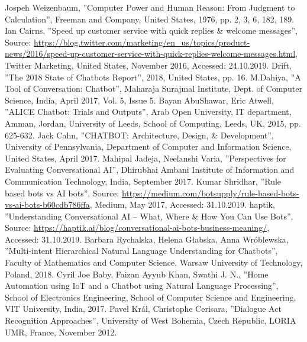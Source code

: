 \documentclass[10pt,final,journal,a4paper,oneside,twocolumn]{IEEEtran}
\begin{document}
\begin{thebibliography}{00}
 Jospeh Weizenbaum, ''Computer Power and Human Reason: From Judgment to Calculation'', Freeman and Company, United States, 1976, pp. 2, 3, 6, 182, 189.
 Ian Cairns, ''Speed up customer service with quick replies \& welcome messages'', Source: \href{https://blog.twitter.com/marketing/en_us/topics/product-news/2016/speed-up-customer-service-with-quick-replies-welcome-messages.html}{https://blog.twitter.com/marketing/en\_us/topics/product-news/2016/speed-up-customer-service-with-quick-replies-welcome-messages.html}, Twitter Marketing, United States, November 2016, Accessed: 24.10.2019.
 Drift, ''The 2018 State of Chatbots Report'', 2018, United States, pp. 16.
 M.Dahiya, ''A Tool of Conversation: Chatbot'', Maharaja Surajmal Institute, Dept. of Computer Science, India, April 2017, Vol. 5, Issue 5.
 Bayan AbuShawar, Eric Atwell, ''ALICE Chatbot: Trials and Outputs'', Arab Open University, IT department, Amman, Jordan, University of Leeds, School of Computing, Leeds, UK, 2015, pp. 625-632.
 Jack Cahn, ''CHATBOT: Architecture, Design, \& Development'', University of Pennsylvania, Department of Computer and Information Science, United States, April 2017.
 Mahipal Jadeja, Neelanshi Varia, ''Perspectives for Evaluating Conversational AI'', Dhirubhai Ambani Institute of Information and Communication Technology, India, September 2017.
 Kumar Shridhar, ''Rule based bots vs AI bots'', Source: \href{https://medium.com/botsupply/rule-based-bots-vs-ai-bots-b60cdb786ffa}{https://medium.com/botsupply/rule-based-bots-vs-ai-bots-b60cdb786ffa}, Medium, May 2017, Accessed: 31.10.2019.
 haptik, ''Understanding Conversational AI – What, Where \& How You Can Use Bots'', Source: \href{https://haptik.ai/blog/conversational-ai-bots-business-meaning/}{https://haptik.ai/blog/conversational-ai-bots-business-meaning/}, Accessed: 31.10.2019.
 Barbara Rychalska, Helena Głabska, Anna Wróblewska, ''Multi-intent Hierarchical Natural Language Understanding for Chatbots'', Faculty  of  Mathematics  and  Computer  Science,  Warsaw  University  of  Technology, Poland, 2018.
 Cyril Joe Baby, Faizan Ayyub Khan, Swathi J. N., ''Home Automation using IoT and a Chatbot using Natural Language Processing'', School of Electronics Engineering, School of Computer Science and Engineering, VIT University, India, 2017.
 Pavel Král, Christophe Cerisara, ''Dialogue Act Recognition Approaches'', University of West Bohemia, Czech Republic, LORIA UMR, France, November 2012.

\end{thebibliography}
\end{document}
